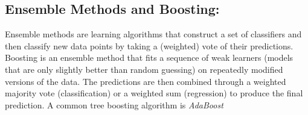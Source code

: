 \subsection{Ensemble Methods and Boosting:} Ensemble methods are learning algorithms that construct a set of classifiers and then classify new data points by taking a (weighted) vote of their predictions. Boosting is an ensemble method that fits a sequence of weak learners (models that are only slightly better than random guessing) on repeatedly modified versions of the data. The predictions are then combined through a weighted majority vote (classification) or a weighted sum (regression) to produce the final prediction. A common tree boosting algorithm is \emph{AdaBoost}